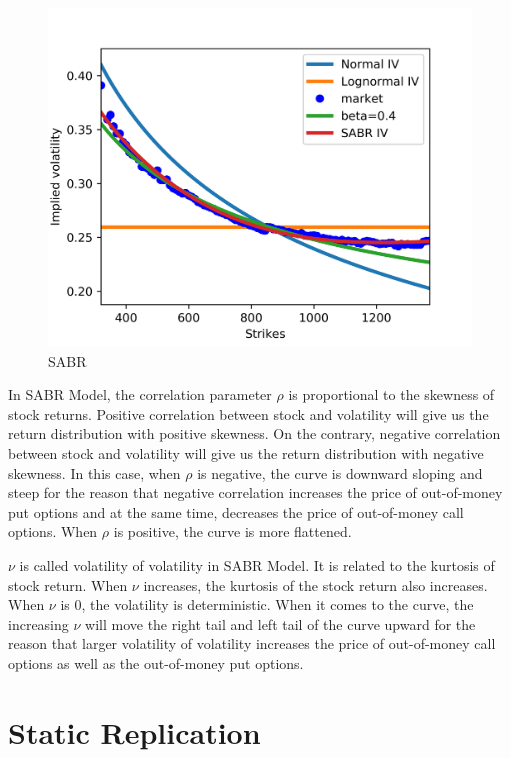 \documentclass[fleqn,12pt]{SelfArx}
\begin{document}
\begin{figure}[ht]\centering
	\includegraphics{SABR}
	\caption{SABR}
\end{figure}

\noindent In SABR Model, the correlation parameter $\rho$ is proportional to the skewness of stock returns. Positive correlation between stock and volatility will give us the return distribution with positive skewness. On the contrary, negative correlation between stock and volatility will give us the return distribution with negative skewness. In this case, when $\rho$ is negative, the curve is downward sloping and steep for the reason that negative correlation increases the price of out-of-money put options and at the same time, decreases the price of out-of-money call options. When $\rho$ is positive, the curve is more flattened. 

\noindent $\nu$ is called volatility of volatility in SABR Model. It is related to the kurtosis of stock return. When $\nu$ increases, the kurtosis of the stock return also increases. When $\nu$ is 0, the volatility is deterministic. When it comes to the curve, the increasing $\nu$ will move the right tail and left tail of the curve upward for the reason that larger volatility of volatility increases the price of out-of-money call options as well as the out-of-money put options. 

\section{Static Replication}
\end{document}
